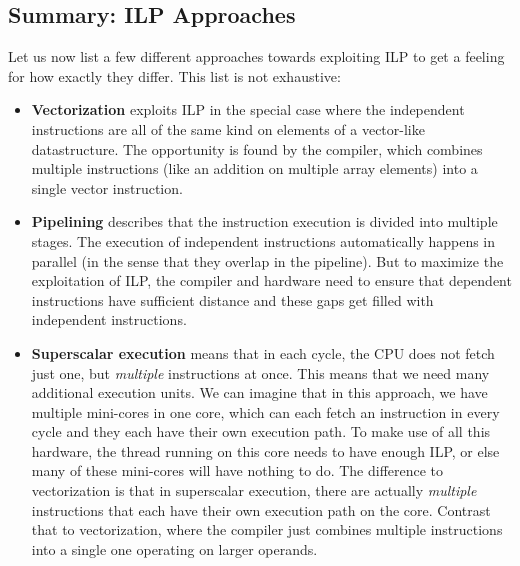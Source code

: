 \documentclass[main.tex]{subfiles}
\begin{document}
\subsection{Summary: ILP Approaches}
Let us now list a few different approaches towards exploiting ILP to get a feeling for how exactly they differ. This list is not exhaustive:
\begin{itemize}
  \item \textbf{Vectorization} exploits ILP in the special case where the independent instructions are all of the same kind on elements of a vector-like datastructure. The opportunity is found by the compiler, which combines multiple instructions (like an addition on multiple array elements) into a single vector instruction.
  \item \textbf{Pipelining} describes that the instruction execution is divided into multiple stages. The execution of independent instructions automatically happens in parallel (in the sense that they overlap in the pipeline). But to maximize the exploitation of ILP, the compiler and hardware need to ensure that dependent instructions have sufficient distance and these gaps get filled with independent instructions.
  \item \textbf{Superscalar execution} means that in each cycle, the CPU does not fetch just one, but \textit{multiple} instructions at once. This means that we need many additional execution units. We can imagine that in this approach, we have multiple mini-cores in one core, which can each fetch an instruction in every cycle and they each have their own execution path. To make use of all this hardware, the thread running on this core needs to have enough ILP, or else many of these mini-cores will have nothing to do. The difference to vectorization is that in superscalar execution, there are actually \textit{multiple} instructions that each have their own execution path on the core. Contrast that to vectorization, where the compiler just combines multiple instructions into a single one operating on larger operands.
\end{itemize}
\end{document}
